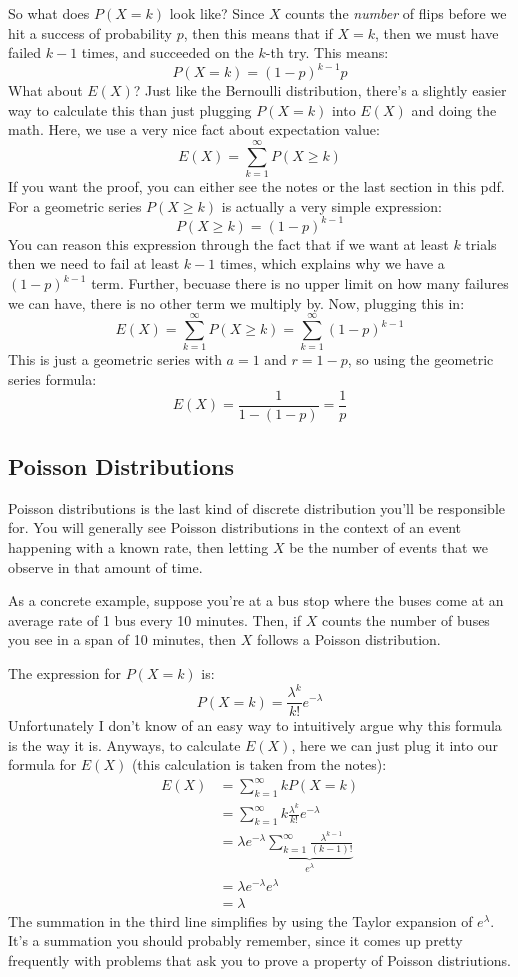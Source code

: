 \documentclass[10pt]{article}
\begin{document}
So what does \( P(X = k) \) look like? Since \( X \) counts the \textit{number} of flips before we hit a success
of probability \( p \), then this means that if \( X = k \), then we must have failed \( k-1 \) times, and 
succeeded on the \( k \)-th try. This means:
\[
P(X = k) = (1-p)^{k-1}p
\] 
What about \( E(X) \)? Just like the Bernoulli distribution, there's a slightly easier way to calculate this than 
just plugging \( P(X = k) \) into \( E(X) \) and doing the math. Here, we use a very nice fact about 
expectation value:
\[
	E(X) = \sum_{k=1}^{\infty} P(X \ge k)
\] 
If you want the proof, you can either see the notes or the last section in this pdf. For a geometric series 
\( P(X \ge k) \) is actually a very simple expression:
\[
P(X \ge k) = (1-p)^{k-1}
\] 
You can reason this expression through the fact that if we want at least \( k \) trials then we need to fail 
at least \( k-1 \) times, which explains why we have a \( (1-p)^{k-1} \) term. Further, becuase there is no 
upper limit on how many failures we can have, there is no other term we multiply by. Now, plugging this in:
\[
	E(X) = \sum_{k=1}^{\infty} P(X \ge k) = \sum_{k =1}^{\infty} (1-p)^{k-1}
\] 
This is just a geometric series with \( a = 1 \) and \( r = 1-p \), so using the geometric series formula:
\[
E(X) = \frac{1}{1 - (1 - p)} = \frac{1}{p}
\] 
\subsection{Poisson Distributions}
Poisson distributions is the last kind of discrete distribution you'll be responsible for. You will generally see 
Poisson distributions in the context of an event happening with a known rate, then letting \( X \) be the number 
of events that we observe in that amount of time. 

As a concrete example, suppose you're at a bus stop where the buses come at an average rate of 1 bus every 10 minutes. 
Then, if \( X \) counts the number of buses you see in a span of 10 minutes, then \( X \) follows a Poisson 
distribution. 

The expression for \( P(X = k) \) is:
\[
P(X = k) = \frac{\lambda^{k}}{k!}e^{-\lambda}
\] 
Unfortunately I don't know of an easy way to intuitively argue why this formula is the way it is. Anyways, 
to calculate \( E(X) \), here we can just plug it into our formula for \( E(X) \) (this calculation is taken from the 
notes):
\begin{align*}
	E(X) &= \sum_{k=1}^{\infty} k P(X = k)\\
	&= \sum_{k=1}^{\infty} k \frac{\lambda^{k}}{k!}e^{-\lambda} \\
	&= \lambda e^{-\lambda}\underbrace{\sum_{k=1}^{\infty} \frac{\lambda^{k-1}}{(k-1)!}}_{e^{\lambda}} \\
	&= \lambda e^{-\lambda} e^{\lambda} \\
	&= \lambda 
\end{align*}
The summation in the third line simplifies by using the Taylor expansion of \( e^{\lambda} \). It's 
a summation you should probably remember, since it comes up pretty frequently with problems that ask you to 
prove a property of Poisson distriutions. 
\end{document}

